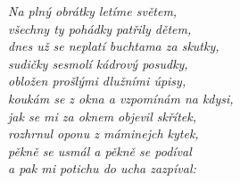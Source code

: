 
\textit{Na plný obrátky letíme světem,\\
všechny ty pohádky patřily dětem,\\
dnes už se neplatí buchtama za skutky,\\
sudičky sesmolí kádrový posudky,\\
obložen prošlými dlužními úpisy,\\
koukám se z okna a vzpomínám na kdysi,\\
jak se mi za oknem objevil skřítek,\\
rozhrnul oponu z máminejch kytek,\\
pěkně se usmál a pěkně se podíval\\
a pak mi potichu do ucha zazpíval:}


\cho{}

\esong